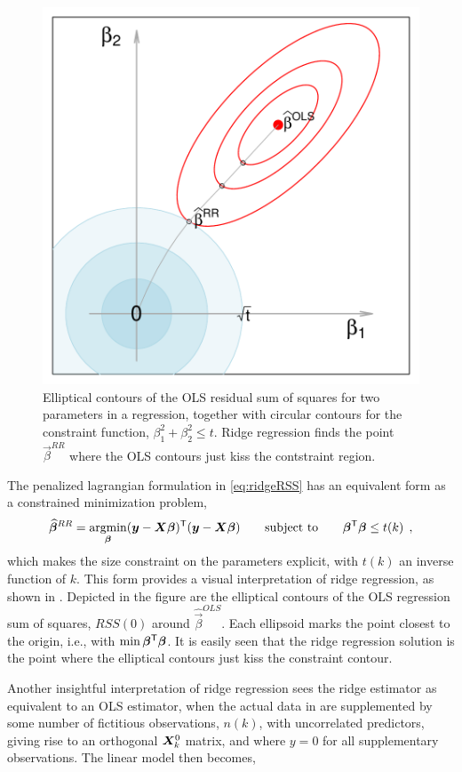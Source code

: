 \begin{figure}[htb!]
  \centering
  \includegraphics[width=.6\textwidth,clip]{fig/ridge-demo}
  \caption{Elliptical contours of the OLS residual sum of squares for two parameters in a regression, together with
  circular contours for the constraint function, $\beta_1^2 + \beta_2^2 \le t$. Ridge regression finds the point $\vec{\beta}^{RR}$ where
  the OLS contours just kiss the contstraint region.}%
  \label{fig:ridge-demo}
\end{figure}
The penalized lagrangian formulation in \eqref{eq:ridgeRSS} has an equivalent form as a constrained
minimization problem,
\begin{equation}
\widehat{\bm{\beta}}^{RR} = \mathop{\mathrm{argmin}}_{\bm{\beta}} (\bm{y}-\bm{X} \bm{\beta}) ^\mathsf{T}  (\bm{y}-\bm{X} \bm{\beta})
  \quad\quad\mbox{subject to}\quad\quad
   \bm{\beta}^\mathsf{T} \bm{\beta} \le t(k)  \:\: , \label{eq:ridge}
\end{equation}
which makes the size constraint on the parameters explicit, with $t(k)$ an inverse function of $k$. This form provides
a visual interpretation of ridge regression, as shown in . Depicted in the figure are the 
elliptical contours of the OLS regression sum of squares, $RSS(0)$ around $\widehat{\vec{\beta}}^{OLS}$.  Each
ellipsoid marks the point closest to the origin, i.e., with $\min \bm{\beta}^\mathsf{T} \bm{\beta}$.
It is easily seen that the ridge regression solution is the point where the elliptical contours just kiss the 
constraint contour.

Another insightful interpretation of ridge regression \citep{Marquardt:1970} sees the ridge estimator as equivalent to
an OLS estimator, when the actual data in  are supplemented by some number of fictitious observations, $n(k)$, 
with uncorrelated predictors,
giving rise to
an orthogonal $\bm{X}_k^0$ matrix, and where $y=0$ for all supplementary observations. The linear model then becomes,

